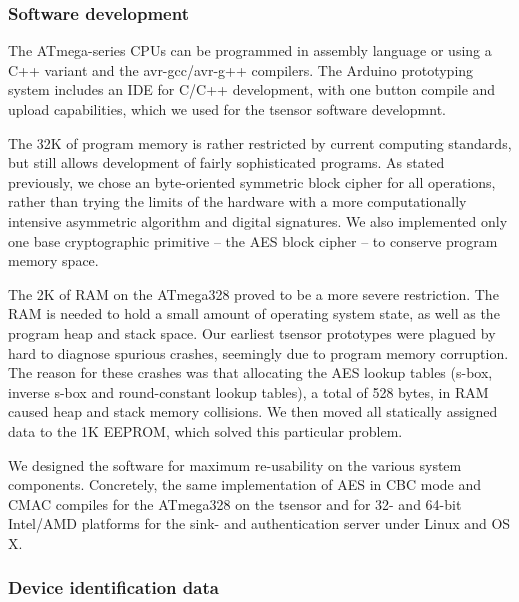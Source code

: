 \subsubsection{Software development} 
\label{tsensor-sdev}

The ATmega-series CPUs can be programmed in assembly language or using a C++ variant and the avr-gcc/avr-g++ compilers. The Arduino prototyping system includes an IDE for C/C++ development, with one button compile and upload capabilities, which we used for the tsensor software developmnt.

The 32K of program memory is rather restricted by current computing standards, but still allows development of fairly sophisticated programs. As stated previously, we chose an byte-oriented symmetric block cipher for all operations, rather than trying the limits of the hardware with a more computationally intensive asymmetric algorithm and digital signatures. We also implemented only one base cryptographic primitive -- the AES block cipher -- to conserve program memory space.

The 2K of RAM on the ATmega328 proved to be a more severe restriction. The RAM is needed to hold a small amount of operating system state, as well as the program heap and stack space. Our earliest tsensor prototypes were plagued by hard to diagnose spurious crashes, seemingly due to program memory corruption. The reason for these crashes was that allocating the AES lookup tables (s-box, inverse s-box and round-constant lookup tables), a total of 528 bytes, in RAM caused heap and stack memory collisions. We then moved all statically assigned data to the 1K EEPROM, which solved this particular problem.

We designed the software for maximum re-usability on the various system components. Concretely, the same implementation of AES in CBC mode and CMAC compiles for the ATmega328 on the tsensor and for 32- and 64-bit Intel/AMD platforms for the sink- and authentication server under Linux and OS X.

\subsubsection{Device identification data}

